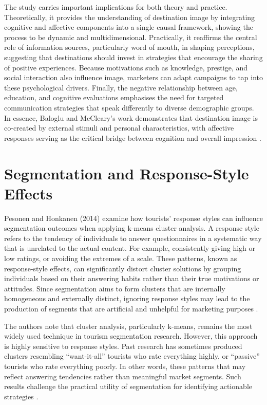 \documentclass[a4paper, 12pt, twoside]{report}  %
\begin{document}
\indent The study carries important implications for both theory and practice. Theoretically, it provides the understanding of destination image by integrating cognitive and affective components into a single causal framework, showing the process to be dynamic and multidimensional. Practically, it reaffirms the central role of information sources, particularly word of mouth, in shaping perceptions, suggesting that destinations should invest in strategies that encourage the sharing of positive experiences. Because motivations such as knowledge, prestige, and social interaction also influence image, marketers can adapt campaigns to tap into these psychological drivers. Finally, the negative relationship between age, education, and cognitive evaluations emphasises the need for targeted communication strategies that speak differently to diverse demographic groups. In essence, Baloglu and McCleary’s work demonstrates that destination image is co-created by external stimuli and personal characteristics, with affective responses serving as the critical bridge between cognition and overall impression \cite{destinationimg}.

\section{Segmentation and Response-Style Effects}

\indent Pesonen and Honkanen (2014) examine how tourists’ response styles can influence segmentation outcomes when applying k-means cluster analysis. A response style refers to the tendency of individuals to answer questionnaires in a systematic way that is unrelated to the actual content. For example, consistently giving high or low ratings, or avoiding the extremes of a scale. These patterns, known as response-style effects, can significantly distort cluster solutions by grouping individuals based on their answering habits rather than their true motivations or attitudes. Since segmentation aims to form clusters that are internally homogeneous and externally distinct, ignoring response styles may lead to the production of segments that are artificial and unhelpful for marketing purposes \cite{clustering}.

\indent The authors note that cluster analysis, particularly k-means, remains the most widely used technique in tourism segmentation research. However, this approach is highly sensitive to response styles. Past research has sometimes produced clusters resembling “want-it-all” tourists who rate everything highly, or “passive” tourists who rate everything poorly. In other words, these patterns that may reflect answering tendencies rather than meaningful market segments. Such results challenge the practical utility of segmentation for identifying actionable strategies \cite{clustering}.
\end{document}
